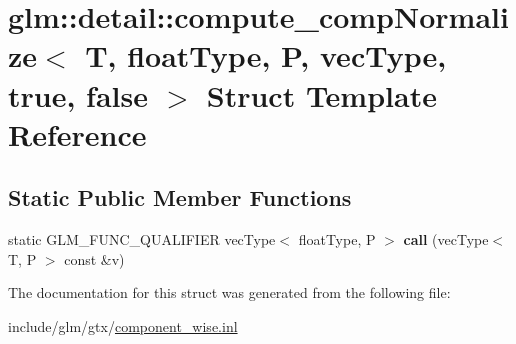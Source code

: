\hypertarget{structglm_1_1detail_1_1compute__compNormalize_3_01T_00_01floatType_00_01P_00_01vecType_00_01true_00_01false_01_4}{}\section{glm\+:\+:detail\+:\+:compute\+\_\+comp\+Normalize$<$ T, float\+Type, P, vec\+Type, true, false $>$ Struct Template Reference}
\label{structglm_1_1detail_1_1compute__compNormalize_3_01T_00_01floatType_00_01P_00_01vecType_00_01true_00_01false_01_4}
\subsection*{Static Public Member Functions}
\begin{DoxyCompactItemize}
\item 
\mbox{\label{structglm_1_1detail_1_1compute__compNormalize_3_01T_00_01floatType_00_01P_00_01vecType_00_01true_00_01false_01_4_a6a0356ee34d9a114e7123c5d4997ab97}} 
static G\+L\+M\+\_\+\+F\+U\+N\+C\+\_\+\+Q\+U\+A\+L\+I\+F\+I\+ER vec\+Type$<$ float\+Type, P $>$ {\bfseries call} (vec\+Type$<$ T, P $>$ const \&v)
\end{DoxyCompactItemize}


The documentation for this struct was generated from the following file\+:\begin{DoxyCompactItemize}
\item 
include/glm/gtx/\hyperlink{component__wise_8inl}{component\+\_\+wise.\+inl}\end{DoxyCompactItemize}
